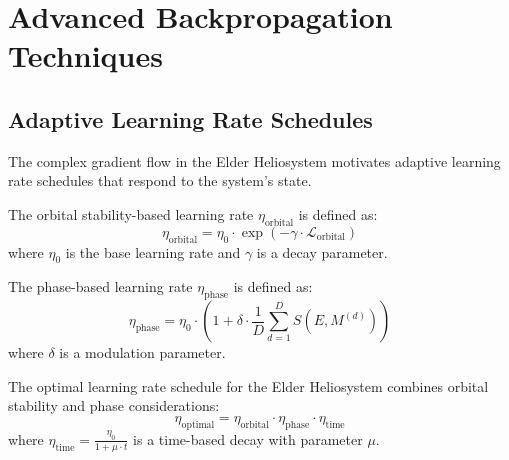 \section{Advanced Backpropagation Techniques}

\subsection{Adaptive Learning Rate Schedules}

The complex gradient flow in the Elder Heliosystem motivates adaptive learning rate schedules that respond to the system's state.

\begin{definition}
The orbital stability-based learning rate $\eta_{\text{orbital}}$ is defined as:
\begin{equation}
\eta_{\text{orbital}} = \eta_0 \cdot \exp\left(-\gamma \cdot \mathcal{L}_{\text{orbital}}\right)
\end{equation}
where $\eta_0$ is the base learning rate and $\gamma$ is a decay parameter.
\end{definition}

\begin{definition}
The phase-based learning rate $\eta_{\text{phase}}$ is defined as:
\begin{equation}
\eta_{\text{phase}} = \eta_0 \cdot \left(1 + \delta \cdot \frac{1}{D} \sum_{d=1}^D S(E, M^{(d)})\right)
\end{equation}
where $\delta$ is a modulation parameter.
\end{definition}

\begin{theorem}
The optimal learning rate schedule for the Elder Heliosystem combines orbital stability and phase considerations:
\begin{equation}
\eta_{\text{optimal}} = \eta_{\text{orbital}} \cdot \eta_{\text{phase}} \cdot \eta_{\text{time}}
\end{equation}
where $\eta_{\text{time}} = \frac{\eta_0}{1 + \mu \cdot t}$ is a time-based decay with parameter $\mu$.
\end{theorem}

